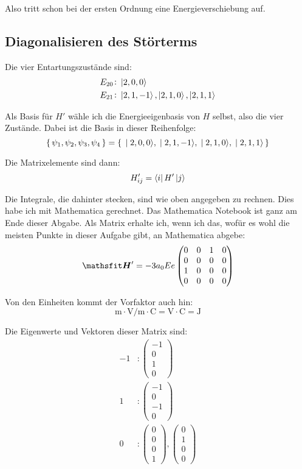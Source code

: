 Also tritt schon bei der ersten Ordnung eine Energieverschiebung auf.

\subsection{Diagonalisieren des Störterms}

Die vier Entartungszustände sind:
\begin{align*}
	E_{20}&\colon \ket{2, 0, 0} \\
	E_{21}&\colon \ket{2, 1, -1}, \ket{2, 1, 0}, \ket{2, 1, 1}
\end{align*}

Als Basis für $H'$ wähle ich die Energieeigenbasis von $H$ selbst, also die
vier Zustände. Dabei ist die Basis in dieser Reihenfolge:
\[
	\set{\psi_1, \psi_2, \psi_3, \psi_4} =
	\set{\ket{2, 0, 0}, \ket{2, 1, -1}, \ket{2, 1, 0}, \ket{2, 1, 1}}
\]

Die Matrixelemente sind dann:
\[
	H'_{ij} = \bra i H' \ket j
\]

Die Integrale, die dahinter stecken, sind wie oben angegeben zu rechnen. Dies
habe ich mit Mathematica gerechnet. Das Mathematica Notebook ist ganz am Ende
dieser Abgabe. Als Matrix erhalte ich, wenn ich das, wofür es wohl die meisten
Punkte in dieser Aufgabe gibt, an Mathematica abgebe:
\[
	\tens H' = - 3 a_0 E e
	\begin{pmatrix}
		0 & 0 & 1 & 0 \\
		0 & 0 & 0 & 0 \\
		1 & 0 & 0 & 0 \\
		0 & 0 & 0 & 0
	\end{pmatrix}
\]

Von den Einheiten kommt der Vorfaktor auch hin:
\[
	\si\meter \cdot \si{\volt\per\meter} \cdot \si\coulomb
	= \si\volt \cdot \si\coulomb
	= \si\joule
\]

Die Eigenwerte und Vektoren dieser Matrix sind:
\begin{align*}
	-1 &\colon
	\begin{pmatrix}
		-1 \\ 0 \\ 1 \\ 0
	\end{pmatrix} \\
	1 &\colon
	\begin{pmatrix}
		-1 \\ 0 \\ -1 \\ 0
	\end{pmatrix} \\
	0 &\colon
	\begin{pmatrix}
		0 \\ 0 \\ 0 \\ 1
	\end{pmatrix}
	,
	\begin{pmatrix}
		0 \\ 1 \\ 0 \\ 0
	\end{pmatrix}
\end{align*}

